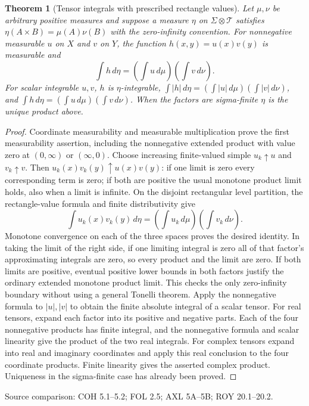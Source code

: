 \documentclass[11pt,oneside,openany]{book}
\newtheorem{theorem}{Theorem}[chapter]
\theoremstyle{definition}
\theoremstyle{remark}
\newcommand{\family}[1]{}
\newcommand{\source}[1]{\par\begingroup\small\sffamily\color{black!65}Source comparison: #1\par\endgroup}
\begin{document}
\begin{theorem}[Tensor integrals with prescribed rectangle values]
\family{D11.08.tensor_integrals}\label{d11:08:tensor-integrals}
Let $\mu,\nu$ be arbitrary positive measures and suppose a measure
$\eta$ on $\Sigma\otimes\mathcal T$ satisfies
$\eta(A\times B)=\mu(A)\nu(B)$ with the zero-infinity convention.
For nonnegative measurable $u$ on $X$ and $v$ on $Y$, the function
$h(x,y)=u(x)v(y)$ is measurable and
\[
 \int h\,d\eta=\left(\int u\,d\mu\right)
                 \left(\int v\,d\nu\right).
\]
For scalar integrable $u,v$, $h$ is $\eta$-integrable,
$\int|h|\,d\eta=(\int|u|\,d\mu)(\int|v|\,d\nu)$, and
$\int h\,d\eta=(\int u\,d\mu)(\int v\,d\nu)$.
When the factors are sigma-finite $\eta$ is the unique product above.
\end{theorem}
\begin{proof}
Coordinate measurability and measurable multiplication prove the first
measurability assertion, including the nonnegative extended product
with value zero at $(0,\infty)$ or $(\infty,0)$.
Choose increasing finite-valued simple $u_k\uparrow u$ and
$v_k\uparrow v$. Then $u_k(x)v_k(y)\uparrow u(x)v(y)$: if one limit is
zero every corresponding term is zero; if both are positive the usual
monotone product limit holds, also when a limit is infinite.
On the disjoint rectangular level partition, the rectangle-value
formula and finite distributivity give
\[
 \int u_k(x)v_k(y)\,d\eta
 =\left(\int u_k\,d\mu\right)\left(\int v_k\,d\nu\right).
\]
Monotone convergence on each of the three spaces proves the desired
identity. In taking the limit of the right side, if one limiting
integral is zero all of that factor's approximating integrals are zero,
so every product and the limit are zero. If both limits are positive,
eventual positive lower bounds in both factors justify the ordinary
extended monotone product limit. This checks the only zero-infinity
boundary without using a general Tonelli theorem.
Apply the nonnegative formula to $|u|,|v|$ to obtain the finite
absolute integral of a scalar tensor. For real tensors, expand each
factor into its positive and negative parts. Each of the four
nonnegative products has finite integral, and the nonnegative formula
and scalar linearity give the product of the two real integrals.
For complex tensors expand into real and imaginary coordinates and
apply this real conclusion to the four coordinate products. Finite
linearity gives the asserted complex product. Uniqueness in the
sigma-finite case has already been proved.
\end{proof}
\source{COH 5.1--5.2; FOL 2.5; AXL 5A--5B; ROY 20.1--20.2.}
\end{document}
